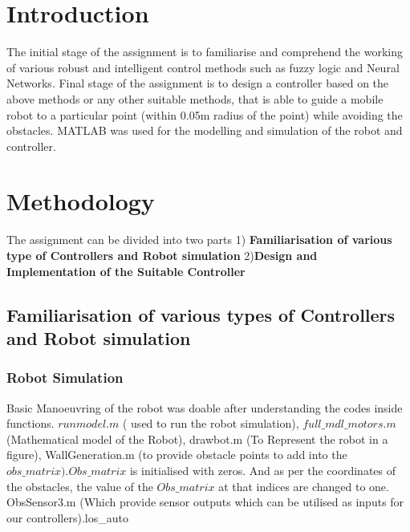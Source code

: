 \documentclass{l4proj}
\begin{document}
\chapter{Introduction}
The initial stage of the assignment is to familiarise and comprehend the working of various robust and intelligent control methods such as fuzzy logic and Neural Networks. Final stage of the assignment is to design a controller based on the above methods or any other suitable methods, that is able to guide a mobile robot to a particular point (within 0.05m radius of the point) while avoiding the obstacles. MATLAB was used for the modelling and simulation of the robot and controller.


 
\chapter{Methodology}
The assignment can be divided into two parts 1) \textbf{Familiarisation of various type of Controllers and Robot simulation } 2)\textbf{Design and Implementation of the Suitable Controller}

\section{Familiarisation of various types of Controllers and Robot simulation}

\subsection{Robot Simulation}
Basic Manoeuvring of the robot was doable after understanding the codes inside functions. $runmodel.m$ ( used to run the robot simulation), $full\_mdl\_motors.m$ (Mathematical model of the Robot), drawbot.m (To Represent the robot in a figure), WallGeneration.m (to provide obstacle points to add into the $obs\_matrix ). Obs\_matrix$ is initialised with zeros. And as per the coordinates of the obstacles, the value of the $Obs\_matrix$ at that indices are changed to one. ObsSensor3.m (Which provide sensor outputs which can be utilised as inputs for our controllers).los\_auto 
\end{document}
